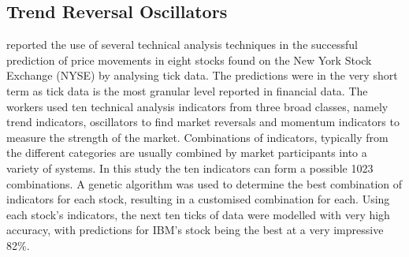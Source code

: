 \subsection{Trend Reversal Oscillators}
\cite{TanakaYamawaki2007125} reported the use of several technical analysis techniques in the successful prediction of price movements in eight stocks found on the New York Stock Exchange (NYSE) by analysing tick data. The predictions were in the very short term as tick data is the most granular level reported in financial data. The workers used ten technical analysis indicators from three broad classes, namely trend indicators, oscillators to find market reversals and momentum indicators to measure the strength of the market. Combinations of indicators, typically from the different categories are usually combined by market participants into a variety of systems. In this study the ten indicators can form a possible 1023 combinations. A genetic algorithm was used to determine the best combination of indicators for each stock, resulting in a customised combination for each. Using each stock's indicators, the next ten ticks of data were modelled with very high accuracy, with predictions for IBM's stock being the best at a very impressive 82\%. 



%

